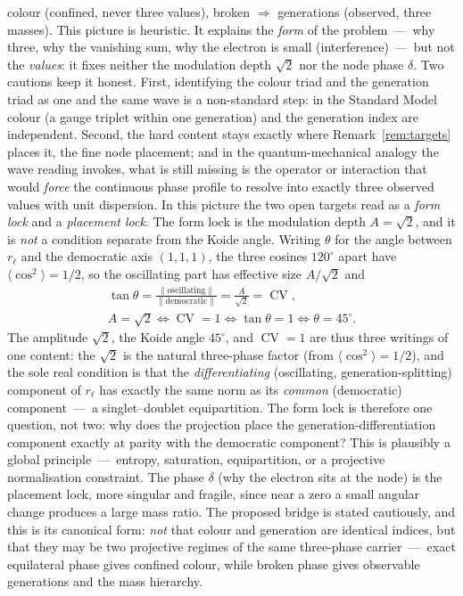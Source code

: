 \documentclass[11pt]{article}
\theoremstyle{definition}
\theoremstyle{remark}
\newcommand{\CV}{\operatorname{CV}}
\newcommand{\rl}{r_{\ell}}
\begin{document}
      colour (confined, never three values), broken $\Rightarrow$ generations (observed, three masses).
      This picture is heuristic.
      It explains the \emph{form} of the problem~---~why three, why the vanishing sum, why the electron is small
      (interference)~---~but not the \emph{values}: it fixes neither the modulation depth $\sqrt2$ nor the node
      phase $\delta$.
      Two cautions keep it honest.
      First, identifying the colour triad and the generation triad as one and the same wave is a non-standard
      step: in the Standard Model colour (a gauge triplet within one generation) and the generation index are
      independent.
      Second, the hard content stays exactly where Remark~\ref{rem:targets} places it, the fine node placement;
      and in the quantum-mechanical analogy the wave reading invokes, what is still missing is the operator or
      interaction that would \emph{force} the continuous phase profile to resolve into exactly three observed
      values with unit dispersion.
      In this picture the two open targets read as a \emph{form lock} and a \emph{placement lock}.
      The form lock is the modulation depth $A = \sqrt2$, and it is \emph{not} a condition separate from the Koide
      angle.
      Writing $\theta$ for the angle between $\rl$ and the democratic axis $(1,1,1)$, the three cosines
      $120^\circ$ apart have $\langle \cos^2 \rangle = 1/2$, so the oscillating part has effective size $A/\sqrt2$
      and
      \begin{equation}
        \label{eq:tan-theta}
        \begin{gathered}
          \tan\theta = \frac{\lVert \text{oscillating} \rVert}{\lVert \text{democratic} \rVert}
          = \frac{A}{\sqrt2} = \CV, \\[2pt]
          A = \sqrt2 \iff \CV = 1 \iff \tan\theta = 1 \iff \theta = 45^\circ .
        \end{gathered}
      \end{equation}
      The amplitude $\sqrt2$, the Koide angle $45^\circ$, and $\CV = 1$ are thus three writings of one content:
      the $\sqrt2$ is the natural three-phase factor (from $\langle \cos^2 \rangle = 1/2$), and the sole real
      condition is that the \emph{differentiating} (oscillating, generation-splitting) component of $\rl$ has
      exactly the same norm as its \emph{common} (democratic) component~---~a singlet--doublet equipartition.
      The form lock is therefore one question, not two: why does the projection place the
      generation-differentiation component exactly at parity with the democratic component?
      This is plausibly a global principle~---~entropy, saturation, equipartition, or a projective normalisation
      constraint.
      The phase $\delta$ (why the electron sits at the node) is the placement lock, more singular and fragile,
      since near a zero a small angular change produces a large mass ratio.
      The proposed bridge is stated cautiously, and this is its canonical form: \emph{not} that colour and
      generation are identical indices, but that they may be two projective regimes of the same three-phase
      carrier~---~exact equilateral phase gives confined colour, while broken phase gives observable generations
      and the mass hierarchy.
\end{document}
